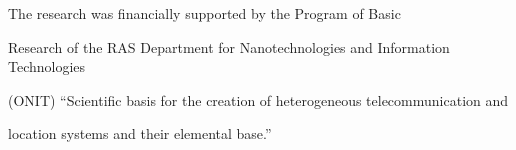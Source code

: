 

















\Ack


\noindent


The research was financially supported by the Program of Basic


Research of the RAS Department for Nanotechnologies and Information Technologies


(ONIT) ``Scientific basis for the creation of heterogeneous telecommunication and


location systems and their elemental base.''








\renewcommand{\bibname}{\protect\rmfamily References}








